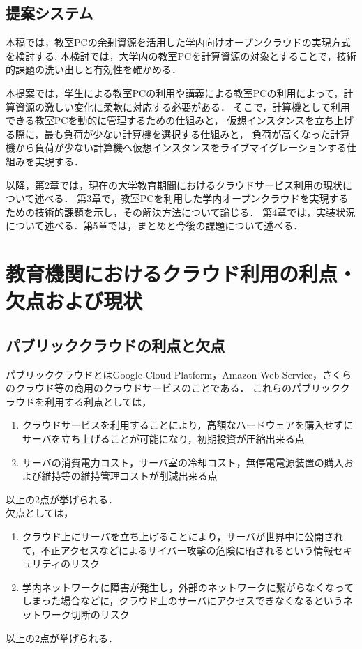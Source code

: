 \subsection{提案システム}
本稿では，教室PCの余剰資源を活用した学内向けオープンクラウドの実現方式を検討する.
本検討では，大学内の教室PCを計算資源の対象とすることで，技術的課題の洗い出しと有効性を確かめる．
\par 本提案では，学生による教室PCの利用や講義による教室PCの利用によって，計算資源の激しい変化に柔軟に対応する必要がある．
そこで，計算機として利用できる教室PCを動的に管理するための仕組みと，
仮想インスタンスを立ち上げる際に，最も負荷が少ない計算機を選択する仕組みと，
負荷が高くなった計算機から負荷が少ない計算機へ仮想インスタンスをライブマイグレーションする仕組みを実現する．
\par 以降，第2章では，現在の大学教育期間におけるクラウドサービス利用の現状について述べる．
第3章で，教室PCを利用した学内オープンクラウドを実現するための技術的課題を示し，その解決方法について論じる．
第4章では，実装状況について述べる．第5章では，まとめと今後の課題について述べる．

\section{教育機関におけるクラウド利用の利点・欠点および現状}
\subsection{パブリッククラウドの利点と欠点}
パブリッククラウドとはGoogle Cloud Platform，Amazon Web Service，さくらのクラウド等の商用のクラウドサービスのことである．
これらのパブリッククラウドを利用する利点としては，
\begin{enumerate}
	\item クラウドサービスを利用することにより，高額なハードウェアを購入せずにサーバを立ち上げることが可能になり，初期投資が圧縮出来る点
	\item サーバの消費電力コスト，サーバ室の冷却コスト，無停電電源装置の購入および維持等の維持管理コストが削減出来る点
\end{enumerate}
以上の2点が挙げられる．
\\ 欠点としては，
\begin{enumerate}
	\item クラウド上にサーバを立ち上げることにより，サーバが世界中に公開されて，不正アクセスなどによるサイバー攻撃の危険に晒されるという情報セキュリティのリスク
	\item 学内ネットワークに障害が発生し，外部のネットワークに繋がらなくなってしまった場合などに，クラウド上のサーバにアクセスできなくなるというネットワーク切断のリスク
\end{enumerate}
以上の2点が挙げられる．
